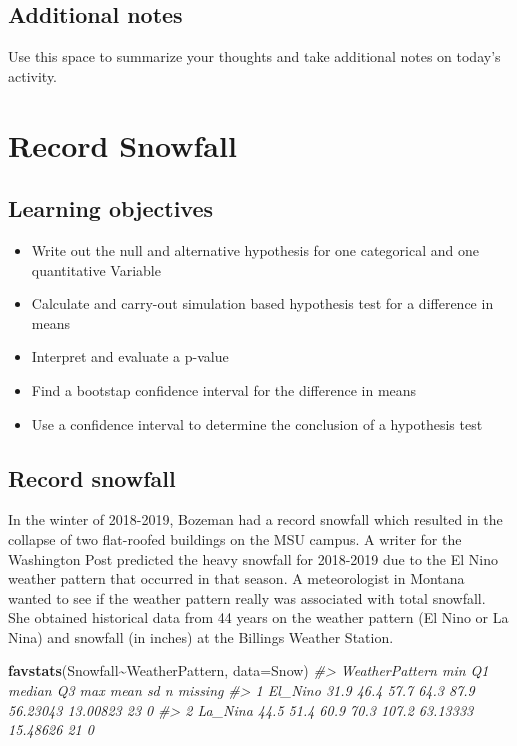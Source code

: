 \documentclass[
]{report}
\newenvironment{Shaded}{\begin{snugshade}}{\end{snugshade}}
\newcommand{\CommentTok}[1]{\textcolor[rgb]{0.56,0.35,0.01}{\textit{#1}}}
\newcommand{\DataTypeTok}[1]{\textcolor[rgb]{0.13,0.29,0.53}{#1}}
\newcommand{\KeywordTok}[1]{\textcolor[rgb]{0.13,0.29,0.53}{\textbf{#1}}}
\newcommand{\NormalTok}[1]{#1}
\newcommand{\OperatorTok}[1]{\textcolor[rgb]{0.81,0.36,0.00}{\textbf{#1}}}
\begin{document}
\hypertarget{additional-notes}{%
\section{Additional notes}\label{additional-notes}}

Use this space to summarize your thoughts and take additional notes on today's activity.

\hypertarget{record-snowfall}{%
\chapter{Record Snowfall}\label{record-snowfall}}

\hypertarget{learning-objectives}{%
\section{Learning objectives}\label{learning-objectives}}

\begin{itemize}
\item
  Write out the null and alternative hypothesis for one categorical and one quantitative Variable
\item
  Calculate and carry-out simulation based hypothesis test for a difference in means
\item
  Interpret and evaluate a p-value
\item
  Find a bootstap confidence interval for the difference in means
\item
  Use a confidence interval to determine the conclusion of a hypothesis test
\end{itemize}

\hypertarget{record-snowfall-1}{%
\section{Record snowfall}\label{record-snowfall-1}}

In the winter of 2018-2019, Bozeman had a record snowfall which resulted in the collapse of two flat-roofed buildings on the MSU campus. A writer for the Washington Post predicted the heavy snowfall for 2018-2019 due to the El Nino weather pattern that occurred in that season. A meteorologist in Montana wanted to see if the weather pattern really was associated with total snowfall. She obtained historical data from 44 years on the weather pattern (El Nino or La Nina) and snowfall (in inches) at the Billings Weather Station.

\begin{Shaded}
\begin{Highlighting}[]
\KeywordTok{favstats}\NormalTok{(Snowfall}\OperatorTok{\textasciitilde{}}\NormalTok{WeatherPattern, }\DataTypeTok{data=}\NormalTok{Snow)}
\CommentTok{\#\textgreater{}   WeatherPattern  min   Q1 median   Q3   max     mean       sd  n missing}
\CommentTok{\#\textgreater{} 1        El\_Nino 31.9 46.4   57.7 64.3  87.9 56.23043 13.00823 23       0}
\CommentTok{\#\textgreater{} 2        La\_Nina 44.5 51.4   60.9 70.3 107.2 63.13333 15.48626 21       0}
\end{Highlighting}
\end{Shaded}
\end{document}
